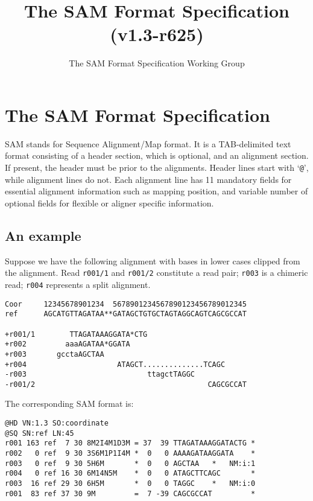 \documentclass[10pt]{article}
\title{The SAM Format Specification (v1.3-r625)}
\author{The SAM Format Specification Working Group}
\begin{document}
\maketitle


\section{The SAM Format Specification}
SAM stands for Sequence Alignment/Map format. It is a TAB-delimited text
format consisting of a header section, which is optional, and an
alignment section. If present, the header must be prior to the
alignments. Header lines start with `{\tt @}', while alignment lines do
not. Each alignment line has 11 mandatory fields for essential alignment
information such as mapping position, and variable number of optional
fields for flexible or aligner specific information.

\subsection{An example}
Suppose we have the following alignment with bases in lower cases
clipped from the alignment. Read {\tt r001/1} and {\tt r001/2}
constitute a read pair; {\tt r003} is a chimeric read; {\tt r004}
represents a split alignment.

\begin{framed}\small
\begin{verbatim}
Coor     12345678901234  5678901234567890123456789012345
ref      AGCATGTTAGATAA**GATAGCTGTGCTAGTAGGCAGTCAGCGCCAT

+r001/1        TTAGATAAAGGATA*CTG
+r002         aaaAGATAA*GGATA
+r003       gcctaAGCTAA
+r004                     ATAGCT..............TCAGC
-r003                            ttagctTAGGC
-r001/2                                        CAGCGCCAT
\end{verbatim}
\end{framed}
The corresponding SAM format is:
\begin{framed}\small
\begin{verbatim}
@HD VN:1.3 SO:coordinate
@SQ SN:ref LN:45
r001 163 ref  7 30 8M2I4M1D3M = 37  39 TTAGATAAAGGATACTG *
r002   0 ref  9 30 3S6M1P1I4M *  0   0 AAAAGATAAGGATA    *
r003   0 ref  9 30 5H6M       *  0   0 AGCTAA   *   NM:i:1
r004   0 ref 16 30 6M14N5M    *  0   0 ATAGCTTCAGC       *
r003  16 ref 29 30 6H5M       *  0   0 TAGGC    *   NM:i:0
r001  83 ref 37 30 9M         =  7 -39 CAGCGCCAT         *
\end{verbatim}
\end{framed}
\end{document}
